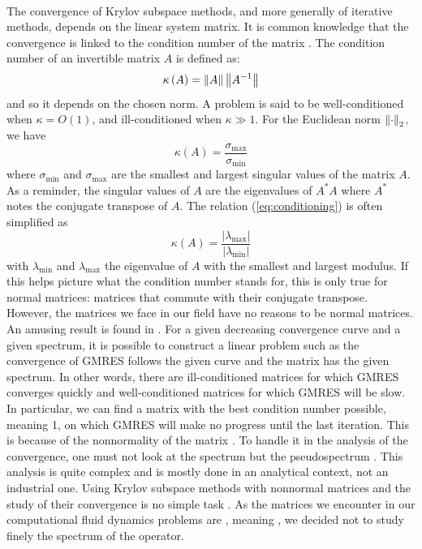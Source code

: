       \paragraph{}
      The convergence of Krylov subspace methods, and more generally of iterative methods, depends on the linear system matrix.
      It is common knowledge that the convergence is linked to the condition number of the matrix \cite{Nevanlinna1994}.
      The condition number of an invertible matrix $A$ is defined as:
      \begin{equation}
        \kappa\left( A \right) = \norm{A} \norm{A^{-1}}
      \end{equation}
      and so it depends on the chosen norm.
      A problem is said to be well-conditioned when $\kappa = O\left(1\right)$, and ill-conditioned when $\kappa \gg 1$.
      For the Euclidean norm $\norm[2]{\cdot}$, we have
  		\begin{equation}\label{eq:conditioning}
  			\kappa\left( A \right) = \frac{\sigma_{\max}}{\sigma_{\min}}
  		\end{equation}
      where $\sigma_{\min}$ and $\sigma_{\max}$ are the smallest and largest singular values of the matrix $A$.
      As a reminder, the singular values of $A$ are the eigenvalues of $A^* A$ where $A^*$ notes the conjugate transpose of $A$.
      The relation (\ref{eq:conditioning}) is often simplified as
      \begin{equation}
        \kappa\left( A \right) = \frac{\left|\lambda_{\max}\right|}{\left|\lambda_{\min}\right|}
      \end{equation}
      with $\lambda_{\min}$ and $\lambda_{\max}$ the eigenvalue of $A$ with the smallest and largest modulus.
      If this helps picture what the condition number stands for, this is only true for normal matrices: matrices that commute with their conjugate transpose.
      However, the matrices we face in our field have no reasons to be normal matrices.
      An amusing result is found in \cite{GreenbaumPtakStrakos1996}.
      For a given decreasing convergence curve and a given spectrum, it is possible to construct a linear problem such as the convergence of GMRES follows the given curve and the matrix has the given spectrum.
      In other words, there are ill-conditioned matrices for which GMRES converges quickly and well-conditioned matrices for which GMRES will be slow.
      In particular, we can find a matrix with the best condition number possible, meaning 1, on which GMRES will make no progress until the last iteration.
      This is because of the nonnormality of the matrix \cite{GreenbaumStrakos1994, GreenbaumPtakStrakos1996}.
      To handle it in the analysis of the convergence, one must not look at the spectrum but the pseudospectrum \cite{Trefethen1991, Trefethen1999}.
      This analysis is quite complex and is mostly done in an analytical context, not an industrial one.
      Using Krylov subspace methods with nonnormal matrices and the study of their convergence is no simple task \cite{LiesenTichy2004, Huhtanen2005}.
      As the matrices we encounter in our computational fluid dynamics problems are , meaning , we decided not to study finely the spectrum of the operator.

